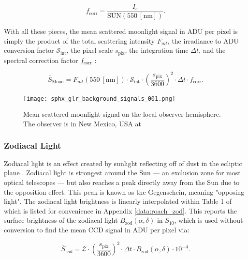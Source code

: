 \begin{equation} \label{eq:krag_f_corr}
  f_\mathrm{corr} = \frac{I_s}{\mathrm{SUN}(550 \: \left[\textrm{nm}\right])}.
\end{equation}

With all these pieces, the mean scattered moonlight signal in ADU per pixel is simply the product of the total scattering intensity $F_{mt}$, the irradiance to ADU conversion factor $\mathcal{S}_\mathrm{int}$, the pixel scale $s_\mathrm{pix}$, the integration time $\Delta t$, and the spectral correction factor $f_\mathrm{corr}$ \cite{krag2003}:

\begin{equation} \label{eq:moonlight_adu}
  \bar{S}_\mathrm{Moon} = F_{mt}(550 \: \left[\textrm{nm}\right]) \cdot \mathcal{S}_\mathrm{int} \cdot \left( \frac{s_\mathrm{pix}}{3600} \right)^2 \cdot \Delta t \cdot f_\mathrm{corr}.
\end{equation}

\begin{figure}[ht]
  \centering
  \texttt{[image: sphx\_glr\_background\_signals\_001.png]}
  \caption{Mean scattered moonlight signal on the local observer hemisphere. The observer is in New Mexico, USA at
  \pogslla}
  \label{fig:moonlight_hemi}
\end{figure}

\subsubsection{Zodiacal Light}

Zodiacal light is an effect created by sunlight reflecting off of dust in the ecliptic plane \cite{krag2003}. Zodiacal light is strongest around the Sun --- an exclusion zone for most optical telescopes --- but also reaches a peak directly away from the Sun due to the opposition effect. This peak is known as the Gegenschein, meaning "opposing light". The zodiacal light brightness is linearly interpolated within Table 1 of \cite{roach1972} which is listed for convenience in Appendix \ref{data:roach_zod}. This reports the surface brightness of the zodiacal light $B_\mathrm{zod}(\alpha, \delta)$ in $S_{10}$, which is used without conversion to find the mean CCD signal in ADU per pixel via:

\begin{equation} \label{eq:zodiacal_adu}
  \bar{S}_{zod} = \mathcal{Z} \cdot \left( \frac{s_\mathrm{pix}}{3600} \right)^2 \cdot \Delta t \cdot B_\mathrm{zod}(\alpha, \delta) \cdot 10^{-4}.
\end{equation}

